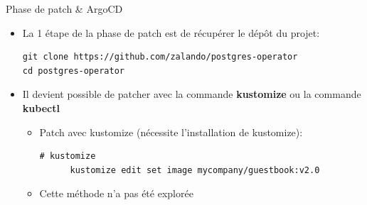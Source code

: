 
\begin{frame}[fragile]{Phase de patch \& ArgoCD}

\begin{itemize}
   \item La 1\iere{} étape de la phase de patch est de récupérer le dépôt du projet:
\begin{tiny}
\begin{Verbatim}[commandchars=\&\@\@]
git clone https://github.com/zalando/postgres-operator
cd postgres-operator
\end{Verbatim}
\end{tiny}
   \item Il devient possible de patcher avec la commande \textbf{kustomize} ou la commande \textbf{kubectl}
   \begin{itemize}
         \item Patch avec kustomize (nécessite l'installation de kustomize):
      \begin{tiny}
      \begin{Verbatim}[commandchars=\\\{\}]
      # kustomize
      kustomize edit set image mycompany/guestbook:v2.0
      \end{Verbatim}
      \end{tiny}
      \item Cette méthode n'a pas été explorée
   \end{itemize}
\end{itemize}

\end{frame}


